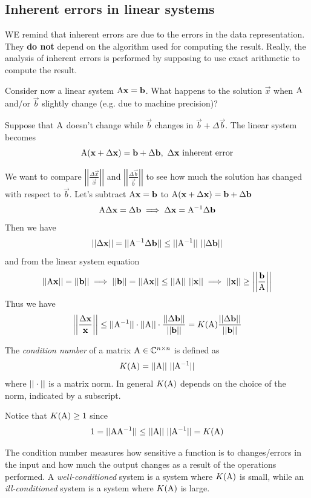 \subsection{Inherent errors in linear systems}
WE remind that inherent errors are due to the errors in the data representation. They \textbf{do not} depend on the algorithm used for computing the result. Really, the analysis of inherent errors is performed by supposing to use exact arithmetic to  compute the result. 

Consider now a linear system $\mathrm{A}\mathbf{x} = \mathbf{b}$. What happens to the solution $\vec{x}$ when $\mathrm{A}$ and/or $\vec{b}$ slightly change (e.g. due to machine precision)?

Suppose that $\mathrm{A}$ doesn't change while $\vec{b}$ changes in $\vec{b} + \Delta\vec{b}$. The linear system becomes
$$ \mathrm{A}(\mathbf{x} + \Delta\mathbf{x}) = \mathbf{b} + \Delta\mathbf{b},\ \Delta\mathbf{x}\ \text{inherent error} $$

We want to compare $\left|\left|\frac{\Delta\vec{x}}{\vec{x}}\right|\right|$ and $\left|\left|\frac{\Delta\vec{b}}{\vec{b}}\right|\right|$ to see how much the solution has changed with respect to $\vec{b}$. Let's subtract $\mathrm{A}\mathbf{x} = \mathbf{b}$ to $\mathrm{A}(\mathbf{x} + \Delta\mathbf{x}) = \mathbf{b} + \Delta\mathbf{b}$
$$ \mathrm{A}\Delta\mathbf{x} = \Delta\mathbf{b} \implies \Delta\mathbf{x} = \mathrm{A}^{-1}\Delta\mathbf{b} $$
Then we have
$$ \norm{\Delta\vec{x}} = \norm{\inv{A}\Delta\vec{b}} \leq \norm{\inv{A}}\ \norm{\Delta\vec{b}} $$
and from the linear system equation
$$ \norm{\mat{A}\vec{x}} = \norm{\vec{b}} \implies \norm{\vec{b}} = \norm{\mat{A}\vec{x}} \leq \norm{\mat{A}}\ \norm{\vec{x}} \implies \norm{\vec{x}} \geq \left|\left|\frac{\vec{b}}{\mat{A}}\right|\right| $$
Thus we have
$$ \left|\left|\frac{\Delta\mathbf{x}}{\mathbf{x}}\right|\right| \leq ||\mathrm{A}^{-1}|| \cdot ||\mathrm{A}|| \cdot \frac{||\Delta\mathbf{b}||}{||\mathbf{b}||} = K(\mathrm{A)}\frac{||\Delta\mathbf{b}||}{||\mathbf{b}||} $$
\begin{definition}
    The \textit{condition number} of a matrix $\mathrm{A} \in \mathbb{C}^{n \times n}$ is defined as
    $$ K(\mat{A}) = \norm{\mat{A}}\ \norm{\inv{A}} $$
    where $||\cdot||$ is a matrix norm. In general $K(\mathrm{A})$ depends on the choice of the norm, indicated by a subscript.
\end{definition}
Notice that $K(\mathrm{A}) \geq 1$ since
$$ 1 = ||\mathrm{A}\mathrm{A}^{-1}|| \leq ||\mathrm{A}||\ ||\mathrm{A}^{-1}|| = K(\mathrm{A}) $$

The condition number measures how sensitive a function is to changes/errors in the input and how much the output changes as a result of the operations performed. A \textit{well-conditioned} system is a system where $K(\mathrm{A})$ is small, while an \textit{ill-conditioned} system is a system where $K(\mathrm{A})$ is large.

